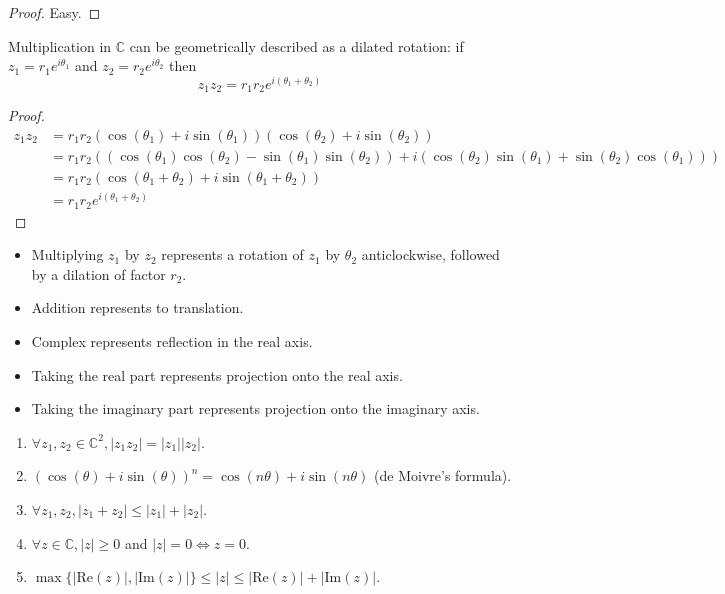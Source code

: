 \begin{proof}
	Easy.
\end{proof}

\begin{lemma}
	Multiplication in $\mathbb{C}$ can be geometrically described as a dilated rotation: if $z_1 = r_1 e^{i \theta_1}$ and $z_2 = r_2 e^{i \theta_2}$ then
	\[
		z_1 z_2 = r_1 r_2 e^{i (\theta_1 + \theta_2)}
	\]
\end{lemma}

\begin{proof}
	\[
		\begin{aligned}
			z_1 z_2
				& = r_1 r_2 (\cos(\theta_1) + i \sin(\theta_1)) (\cos(\theta_2) + i \sin(\theta_2)) \\
				& = r_1 r_2 ((\cos(\theta_1) \cos(\theta_2) - \sin(\theta_1) \sin(\theta_2)) + i (\cos(\theta_2) \sin(\theta_1) + \sin(\theta_2) \cos(\theta_1))) \\
				& = r_1 r_2 (\cos(\theta_1 + \theta_2) + i \sin(\theta_1 + \theta_2)) \\
				& = r_1 r_2 e^{i (\theta_1 + \theta_2)}
		\end{aligned}
	\]
\end{proof}

\begin{remark}
	\hfill
	\begin{itemize}
		\item Multiplying $z_1$ by $z_2$ represents a rotation of $z_1$ by $\theta_2$ anticlockwise, followed by a dilation of factor $r_2$.
		\item Addition represents to translation.
		\item Complex represents reflection in the real axis.
		\item Taking the real part represents projection onto the real axis.
		\item Taking the imaginary part represents projection onto the imaginary axis.
	\end{itemize}
\end{remark}

\begin{corollary}
	\hfill
	\begin{enumerate}
		\item $\forall z_1, z_2 \in \mathbb{C}^2, |z_1 z_2| = |z_1| |z_2|$.
		\item ${(\cos(\theta) + i \sin(\theta))}^n = \cos(n \theta) + i \sin(n \theta)$ (de Moivre's formula).
		\item $\forall z_1, z_2, |z_1 + z_2| \le |z_1| + |z_2|$.
		\item $\forall z \in \mathbb{C}, |z| \ge 0$ and $|z| = 0 \Longleftrightarrow z = 0$.
		\item $\max \{ |\text{Re}(z)|, |\text{Im}(z)| \} \le |z| \le |\text{Re}(z)| + |\text{Im}(z)|$.
	\end{enumerate}
\end{corollary}

